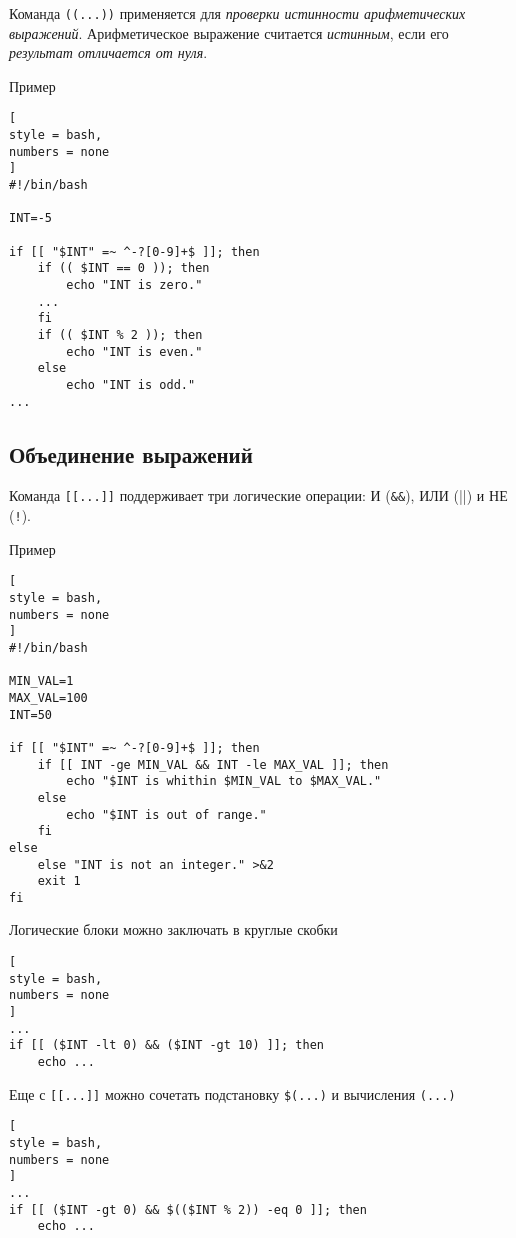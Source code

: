 \documentclass[%
	11pt,
	a4paper,
	utf8,
		]{article}
\begin{document}
Команда \verb|((...))| применяется для \emph{проверки истинности арифметических выражений}. Арифметическое выражение считается \emph{истинным}, если его \emph{результат отличается от нуля}.

Пример
\begin{lstlisting}[
style = bash,
numbers = none
]
#!/bin/bash

INT=-5

if [[ "$INT" =~ ^-?[0-9]+$ ]]; then
    if (( $INT == 0 )); then
        echo "INT is zero."
    ...
    fi
    if (( $INT % 2 )); then
        echo "INT is even."
    else
        echo "INT is odd."
...
\end{lstlisting}

\subsection{Объединение выражений}

Команда \verb|[[...]]| поддерживает три логические операции: И (\verb|&&|), ИЛИ (\verb||||) и НЕ (\verb|!|).

Пример
\begin{lstlisting}[
style = bash,
numbers = none
]
#!/bin/bash

MIN_VAL=1
MAX_VAL=100
INT=50

if [[ "$INT" =~ ^-?[0-9]+$ ]]; then
    if [[ INT -ge MIN_VAL && INT -le MAX_VAL ]]; then
        echo "$INT is whithin $MIN_VAL to $MAX_VAL."
    else
        echo "$INT is out of range."
    fi
else
    else "INT is not an integer." >&2
    exit 1
fi
\end{lstlisting}

Логические блоки можно заключать в круглые скобки
\begin{lstlisting}[
style = bash,
numbers = none
]
...
if [[ ($INT -lt 0) && ($INT -gt 10) ]]; then
    echo ...
\end{lstlisting}

Еще с \verb|[[...]]| можно сочетать подстановку \verb|$(...)| и вычисления \verb|(...)|
\begin{lstlisting}[
style = bash,
numbers = none
]
...
if [[ ($INT -gt 0) && $(($INT % 2)) -eq 0 ]]; then
    echo ...
\end{lstlisting}
\end{document}
